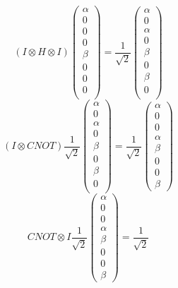 \documentclass[11pt,fleqn]{article}
\begin{document}
\begin{enumerate}
\[
(I \otimes H \otimes I)
 \left( \begin{array}{cccccccc}
\alpha \\
0 \\ 
0 \\
0 \\
\beta \\
0 \\
0 \\
0 \\
\end{array} \right) = 
\frac{1}{\sqrt{2}}
 \left( \begin{array}{cccccccc}
\alpha \\
0 \\ 
\alpha \\
0 \\
\beta \\
0 \\
\beta \\
0 \\
\end{array} \right)
\] 
\[
(I  \otimes CNOT)\frac{1}{\sqrt{2}}
 \left( \begin{array}{cccccccc}
\alpha \\
0 \\ 
\alpha \\
0 \\
\beta \\
0 \\
\beta \\
0 \\
\end{array} \right) = \frac{1}{\sqrt{2}}
 \left( \begin{array}{cccccccc}
\alpha \\
0 \\
0 \\
\alpha \\
\beta \\
0 \\
0 \\
\beta
\end{array} \right)
\]
\[
CNOT \otimes I \frac{1}{\sqrt{2}}
 \left( \begin{array}{cccccccc}
\alpha \\
0 \\
0 \\
\alpha \\
\beta \\
0 \\
0 \\
\beta
\end{array} \right)= \frac{1}{\sqrt{2}}
\]
\end{enumerate}
\end{document}
